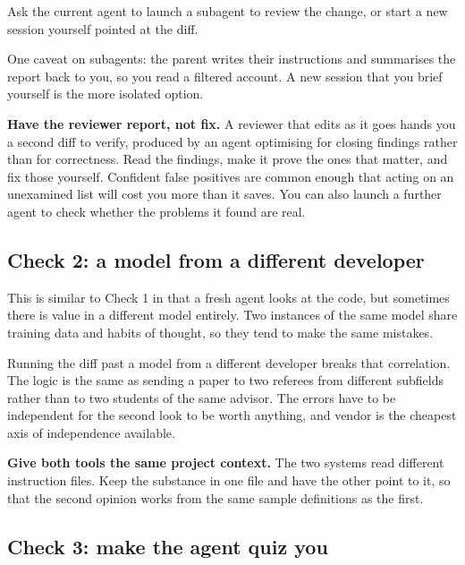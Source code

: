 \documentclass[11pt,a4paper]{article}
\begin{document}
Ask the current agent to launch a subagent to review the change, or start a new
session yourself pointed at the diff.

One caveat on subagents: the parent writes their instructions and summarises the
report back to you, so you read a filtered account. A new session that you brief
yourself is the more isolated option.

\begin{aside}
\textbf{Have the reviewer report, not fix.} A reviewer that edits as it goes hands
you a second diff to verify, produced by an agent optimising for closing findings
rather than for correctness. Read the findings, make it prove the ones that
matter, and fix those yourself. Confident false positives are common enough that
acting on an unexamined list will cost you more than it saves. You can also
launch a further agent to check whether the problems it found are real.
\end{aside}

\subsection{Check 2: a model from a different developer}

This is similar to Check 1 in that a fresh agent looks at the code, but sometimes
there is value in a different model entirely. Two instances of the same model
share training data and habits of thought, so they tend to make the same
mistakes.

Running the diff past a model from a different developer breaks that correlation.
The logic is the same as sending a paper to two referees from different subfields
rather than to two students of the same advisor. The errors have to be
independent for the second look to be worth anything, and vendor is the cheapest
axis of independence available.

\begin{aside}
\textbf{Give both tools the same project context.} The two systems read different
instruction files. Keep the substance in one file and have the other point to it,
so that the second opinion works from the same sample definitions as the first.
\end{aside}

\subsection{Check 3: make the agent quiz you}
\label{sec:quiz}
\end{document}
